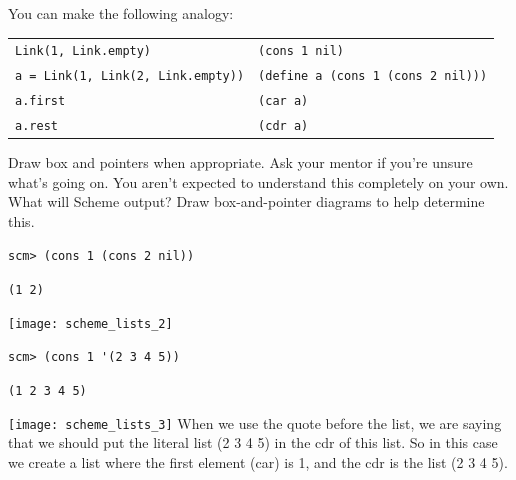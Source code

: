 \begin{nonsol}
You can make the following analogy:
\begin{center}
\begin{tabular}{ |l|l| }
\hline
 \texttt{Link(1, Link.empty)} & \texttt{(cons 1 nil)} \\
 \texttt{a = Link(1, Link(2, Link.empty))} & \texttt{(define a (cons 1 (cons 2 nil)))}  \\
 \texttt{a.first} & \texttt{(car a)} \\
 \texttt{a.rest} & \texttt{(cdr a)} \\
 \hline
\end{tabular}

\end{center}
 Draw box and pointers when appropriate. Ask your mentor if you're unsure what's going on. You aren't expected to understand this completely on your own.
\question What will Scheme output? Draw box-and-pointer diagrams to help determine this.
\end{nonsol}

\begin{lstlisting}
scm> (cons 1 (cons 2 nil))
\end{lstlisting}
\begin{solution}[0.25in]
\texttt{(1 2)}
\begin{center}
\texttt{[image: scheme\_lists\_2]}
\end{center}
\end{solution}

\begin{lstlisting}
scm> (cons 1 '(2 3 4 5))
\end{lstlisting}
\begin{solution}[0.25in]
\texttt{(1 2 3 4 5)}
\begin{center}
\texttt{[image: scheme\_lists\_3]}
When we use the quote before the list, we are saying that we should put the literal list (2 3 4 5) in the cdr of this list. So in this case we create a list where the first element (car) is 1, and the cdr is the list (2 3 4 5).
\end{center}
\end{solution}

